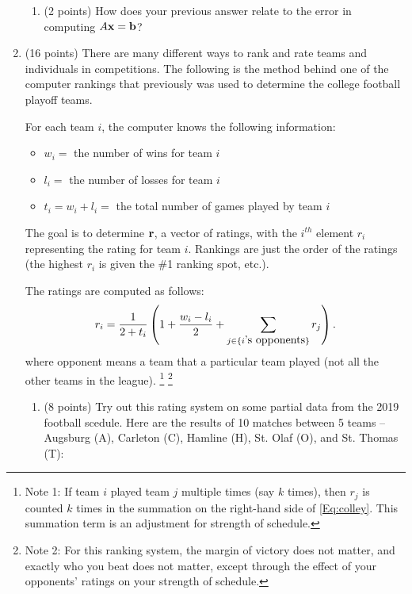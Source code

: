 \documentclass[12point]{article}
\def\r{{\mathbf{r}}}
\def\b{{\bf b}}
\def\r{{\bf r}}
\def\x{{\bf x}}
\begin{document}
\begin{enumerate}
\begin{enumerate}
	\item (2 points) How does your previous answer relate to the error in computing $A\x=\b$? 
	\vspace{0.5in}
\end{enumerate}


\newpage



\item (16 points) There are many different ways to rank and rate teams and individuals in competitions. The following is the method behind one of the computer rankings that previously was used to determine the college football playoff teams.

For each team $i$, the computer knows the following information:
\begin{itemize}
\item $w_i=$ the number of wins for team $i$
\item $l_i=$ the number of losses for team $i$
\item $t_i=w_i+l_i=$ the total number of games played by team $i$
\end{itemize}
The goal is to determine $\r$, a vector of ratings, with the $i^{th}$ element $r_i$ representing the rating for team $i$. Rankings are just the order of the ratings (the highest $r_i$ is given the \#1 ranking spot, etc.).

The ratings are computed as follows:
\begin{align} \label{Eq:colley}
r_i = \frac{1}{2+t_i}\left(1+\frac{w_i-l_i}{2}+\sum\limits_{j \in \{i\hbox{'s opponents}\}}r_j\right).
\end{align}
where opponent means a team that a particular team played (not all the other teams in the league).
\footnote{
Note 1: If team $i$ played team $j$ multiple times (say $k$ times), then $r_j$ is counted $k$ times in the summation on the right-hand side of \eqref{Eq:colley}. This summation term is an adjustment for strength of schedule.
}
\footnote{
Note 2: For this ranking system, the margin of victory does not matter, and exactly who you beat does not matter, except through the effect of your opponents' ratings on your strength of schedule.}

\begin{enumerate}
\item (8 points) Try out this rating system on some partial data from the 2019 football scedule. Here are the results of 10 matches between 5 teams -- Augsburg (A), Carleton (C), Hamline (H), St. Olaf (O), and St. Thomas (T):



\end{enumerate}
\end{enumerate}
\end{document}
